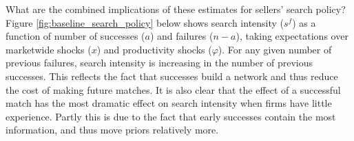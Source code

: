 What are the combined implications of these estimates for sellers' search
policy? Figure \ref{fig:baseline_search_policy} below shows search intensity
($s^{f}$) as a function of number of successes ($a$) and failures ($n-a$),
taking expectations over marketwide shocks ($x$) and productivity shocks ($%
\varphi $). For any given number of previous failures, search intensity is
increasing in the number of previous successes. This reflects the fact that
successes build a network and thus reduce the cost of making future matches.
It is also clear that the effect of a successful match has the most dramatic
effect on search intensity when firms have little experience. Partly this is
due to the fact that early successes contain the most information, and thus
move priors relatively more.



